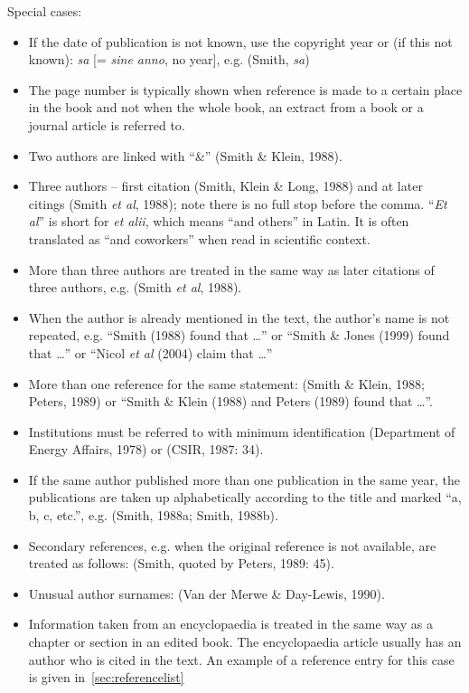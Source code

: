 \documentclass[a5paper, 10pt]{article}
\begin{document}
Special cases:
\begin{itemize}
\item If the date of publication is not known, use the copyright year
  or (if this not known): \emph{sa} [= \emph{sine anno}, no year], e.g. (Smith,
  \emph{sa})
\item The page number is typically shown when reference is made to a
  certain place in the book and not when the whole book, an extract
  from a book or a journal article is referred to.
\item Two authors are linked with ``\&'' (Smith \& Klein, 1988).
\item Three authors -- first citation (Smith, Klein \& Long, 1988) and
  at later citings (Smith \emph{et al}, 1988); note there is no full
  stop before the comma.  ``\emph{Et al}'' is short for \emph{et alii},
  which means ``and others'' in Latin.  It is often translated as
  ``and coworkers'' when read in scientific context.
\item More than three authors are treated in the same way as later
  citations of three authors, e.g. (Smith \emph{et al}, 1988).
\item When the author is already mentioned in the text, the author's
  name is not repeated, e.g. ``Smith (1988) found that \dots'' or
  ``Smith \& Jones (1999) found that \dots'' or ``Nicol \emph{et al} (2004)
  claim that \dots''
\item More than one reference for the same statement: (Smith \& Klein,
  1988; Peters, 1989) or ``Smith \& Klein (1988) and Peters
  (1989) found that \dots''.
\item Institutions must be referred to with minimum identification
  (Department of Energy Affairs, 1978) or (CSIR, 1987: 34).
\item If the same author published more than one publication in the
  same year, the publications are taken up alphabetically according to
  the title and marked ``a, b, c, etc.'', e.g. (Smith, 1988a; Smith,
  1988b).
\item Secondary references, e.g. when the original reference is not
  available, are treated as follows: (Smith, quoted by Peters, 1989:
  45).
\item Unusual author surnames: (Van der Merwe \& Day-Lewis, 1990).
\item Information taken from an encyclopaedia is treated in the same
  way as a chapter or section in an edited book.  The encyclopaedia
  article usually has an author who is cited in the text.  An example
  of a reference entry for this case is given in~\ref{sec:referencelist}
\end{itemize}
\end{document}
